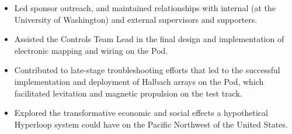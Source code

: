 \documentclass[10pt, letterpaper]{article}
\newcommand{\tabularxwidth}{\textwidth}
\begin{document}
\begin{minipage}{\tabularxwidth}
\begin{itemize}[noitemsep, topsep=3pt, parsep=0pt, partopsep=0pt]
                \item 
    Led sponsor outreach, and maintained relationships with internal (at the University of Washington) and external supervisors and supporters.
            
                \item 
    Assisted the Controls Team Lead in the final design and implementation of electronic mapping and wiring on the Pod.
            
                \item 
    Contributed to late-stage troubleshooting efforts that led to the successful implementation and deployment of Halbach arrays on the Pod, which facilitated levitation and magnetic propulsion on the test track.
            
                \item 
    Explored the transformative economic and social effects a hypothetical Hyperloop system could have on the Pacific Northwest of the United States.
            
        \end{itemize}

        
            \vspace{.5em}
        

    \end{minipage}
    
\end{document}
